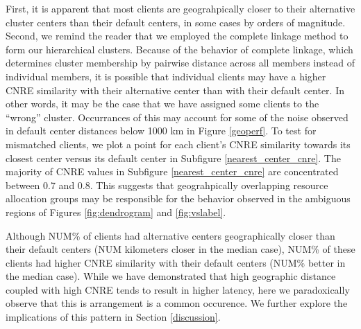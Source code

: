 First, it is apparent that most clients are geograhpically closer to their
alternative cluster centers than their default centers, in some cases by orders
of magnitude. Second, we remind the reader that we employed the complete linkage
method to form our hierarchical clusters. Because of the behavior of complete
linkage, which determines cluster membership by pairwise distance across all
members instead of individual members, it is possible that individual clients
may have a higher CNRE similarity with their alternative center than with their
default center. In other words, it may be the case that we have assigned some
clients to the ``wrong'' cluster. Occurrances of this may account for some of
the noise observed in default center distances below 1000 km in Figure
\ref{geoperf}. To test for mismatched clients, we plot a point for each client's CNRE similarity
towards its closest center versus its default center in Subfigure
\ref{nearest_center_cnre}. The majority of CNRE
values in Subfigure \ref{nearest_center_cnre} are concentrated between 0.7 and
0.8. This suggests that geograhpically overlapping resource allocation groups
may be responsible for the behavior observed in the ambiguous regions of Figures
\ref{fig:dendrogram} and \ref{fig:vslabel}. 

Although NUM\% of clients had alternative centers geographically closer than
their default centers (NUM kilometers closer in the median case), NUM\% of these
clients had higher CNRE similarity with their default centers (NUM\% better in
the median case). While we have demonstrated that high geographic distance
coupled with high CNRE tends to result in higher latency, here we paradoxically
observe that this is arrangement is a common occurence. We further explore the
implications of this pattern in Section \ref{discussion}.
